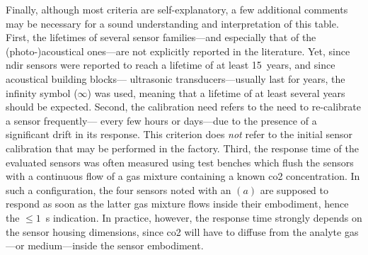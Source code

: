 Finally, although most criteria are self-explanatory, a few additional comments may be necessary for a sound understanding and interpretation of this table. First, the lifetimes of several sensor families---and especially that of the (photo-)acoustical ones---are not explicitly reported in the literature. Yet, since \gls{ndir} sensors were reported to reach a lifetime of at least 15~years\cite{gibson2013}, and since acoustical building blocks---\eg{} ultrasonic transducers---usually last for years, the infinity symbol ($\infty$) was used, meaning that a lifetime of at least several years should be expected. Second, the calibration need refers to the need to re-calibrate a sensor frequently---\ie{} every few hours or days---due to the presence of a significant drift in its response. This criterion does \emph{not} refer to the initial sensor calibration that may be performed in the factory. Third, the response time of the evaluated sensors was often measured using test benches which flush the sensors with a continuous flow of a gas mixture containing a known \gls{co2} concentration. In such a configuration, the four sensors noted with an $(a)$ are supposed to respond as soon as the latter gas mixture flows inside their embodiment, hence the $\leq 1$~s indication. In practice, however, the response time strongly depends on the sensor housing dimensions, since \gls{co2} will have to diffuse from the analyte gas---or medium---inside the sensor embodiment.

